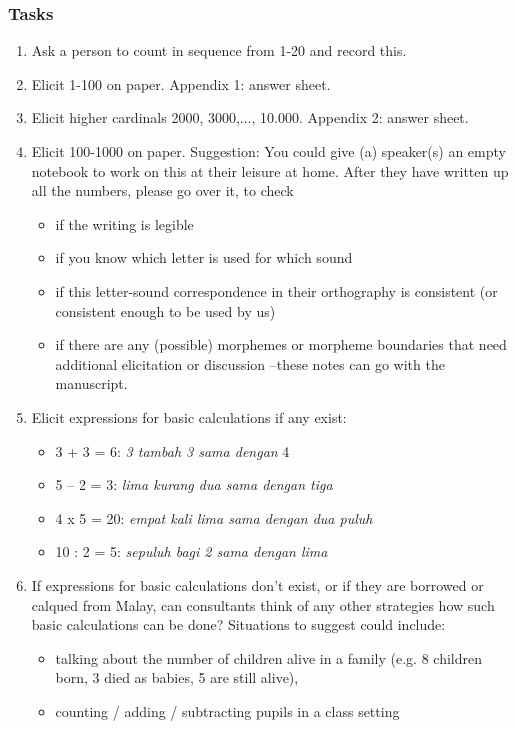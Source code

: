 \subsubsection*{Tasks}
\begin{enumerate}
\item Ask a person to count in sequence from 1-20 and record this.
\item Elicit 1-100 on paper. Appendix 1: answer sheet.
\item Elicit higher cardinals 2000, 3000,..., 10.000. Appendix 2: answer sheet.
\item Elicit 100-1000 on paper. Suggestion: You could give (a) speaker(s) an empty  notebook to work on this at their leisure at home. After they have written up all the numbers, please go over it, to check
  \begin{itemize}
  \item if the writing is legible
  \item if you know which letter is used for which sound
  \item if this letter-sound correspondence in their orthography is consistent (or consistent enough to be used by us)
  \item if there are any (possible) morphemes or morpheme boundaries that need additional elicitation or discussion --these notes can go with the manuscript.
  \end{itemize}
\item Elicit expressions for basic calculations if any exist:
  \begin{itemize}
  \item 3 + 3 = 6: \textit{3 tambah 3 sama dengan} 4
  \item 5 -- 2 = 3: \textit{lima kurang dua sama dengan tiga}
  \item 4 x 5 = 20: \textit{empat kali lima sama dengan dua puluh}
  \item 10 : 2 = 5: \textit{sepuluh bagi 2 sama dengan lima}
  \end{itemize}
\item If expressions for basic calculations don't exist, or if they are borrowed or calqued from Malay, can consultants think of any other strategies how such basic calculations can be done? Situations to suggest could include:
  \begin{itemize}
  \item talking about the number of children alive in a family (e.g. 8 children born, 3 died as babies, 5 are still alive),
  \item counting / adding / subtracting pupils in a class setting

\end{itemize}
\end{enumerate}
